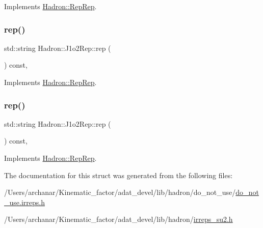 Implements \mbox{\hyperlink{structHadron_1_1RepRep_ab3213025f6de249f7095892109575fde}{Hadron\+::\+Rep\+Rep}}.

\mbox{\label{structHadron_1_1J1o2Rep_a4e049281173fb575d28821d31e36df00}} 
\subsubsection{\texorpdfstring{rep()}{rep()}\hspace{0.1cm}{\footnotesize\ttfamily [2/3]}}
{\footnotesize\ttfamily std\+::string Hadron\+::\+J1o2\+Rep\+::rep (\begin{DoxyParamCaption}{ }\end{DoxyParamCaption}) const\hspace{0.3cm}{\ttfamily [inline]}, {\ttfamily [virtual]}}



Implements \mbox{\hyperlink{structHadron_1_1RepRep_ab3213025f6de249f7095892109575fde}{Hadron\+::\+Rep\+Rep}}.

\mbox{\label{structHadron_1_1J1o2Rep_a4e049281173fb575d28821d31e36df00}} 
\subsubsection{\texorpdfstring{rep()}{rep()}\hspace{0.1cm}{\footnotesize\ttfamily [3/3]}}
{\footnotesize\ttfamily std\+::string Hadron\+::\+J1o2\+Rep\+::rep (\begin{DoxyParamCaption}{ }\end{DoxyParamCaption}) const\hspace{0.3cm}{\ttfamily [inline]}, {\ttfamily [virtual]}}



Implements \mbox{\hyperlink{structHadron_1_1RepRep_ab3213025f6de249f7095892109575fde}{Hadron\+::\+Rep\+Rep}}.



The documentation for this struct was generated from the following files\+:\begin{DoxyCompactItemize}
\item 
/\+Users/archanar/\+Kinematic\+\_\+factor/adat\+\_\+devel/lib/hadron/do\+\_\+not\+\_\+use/\mbox{\hyperlink{do__not__use_8irreps_8h}{do\+\_\+not\+\_\+use.\+irreps.\+h}}\item 
/\+Users/archanar/\+Kinematic\+\_\+factor/adat\+\_\+devel/lib/hadron/\mbox{\hyperlink{lib_2hadron_2irreps__su2_8h}{irreps\+\_\+su2.\+h}}\end{DoxyCompactItemize}
